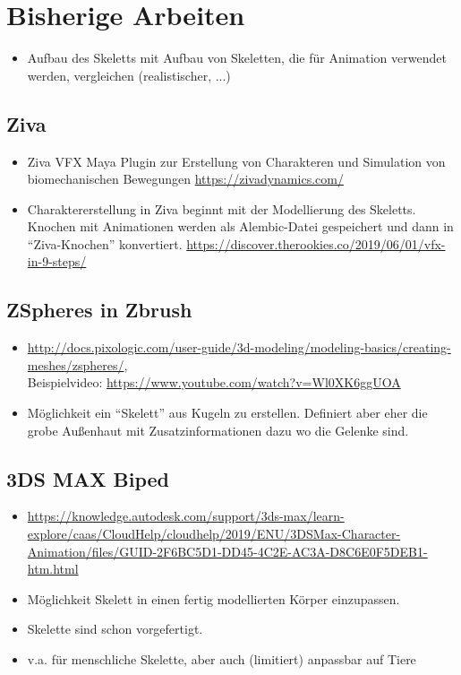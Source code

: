 \chapter{Bisherige Arbeiten}

\begin{itemize}
 \item Aufbau des Skeletts mit Aufbau von Skeletten, die für Animation verwendet werden, vergleichen (realistischer, ...)
\end{itemize}



\section{Ziva}

\begin{itemize}
 \item Ziva VFX Maya Plugin zur Erstellung von Charakteren und Simulation von biomechanischen Bewegungen \url{https://zivadynamics.com/}
 \item Charaktererstellung in Ziva beginnt mit der Modellierung des Skeletts. Knochen mit Animationen werden als Alembic-Datei gespeichert und dann in "`Ziva-Knochen"' konvertiert. \url{https://discover.therookies.co/2019/06/01/vfx-in-9-steps/}
\end{itemize}

\section{ZSpheres in Zbrush}

\begin{itemize}
 \item \url{http://docs.pixologic.com/user-guide/3d-modeling/modeling-basics/creating-meshes/zspheres/},\\ Beispielvideo: \url{https://www.youtube.com/watch?v=Wl0XK6ggUOA}
 \item Möglichkeit ein "`Skelett"' aus Kugeln zu erstellen. Definiert aber eher die grobe Außenhaut mit Zusatzinformationen dazu wo die Gelenke sind.
\end{itemize}

\section{3DS MAX Biped}

\begin{itemize}
 \item \url{https://knowledge.autodesk.com/support/3ds-max/learn-explore/caas/CloudHelp/cloudhelp/2019/ENU/3DSMax-Character-Animation/files/GUID-2F6BC5D1-DD45-4C2E-AC3A-D8C6E0F5DEB1-htm.html}
 \item Möglichkeit Skelett in einen fertig modellierten Körper einzupassen. 
 \item Skelette sind schon vorgefertigt.
 \item v.a. für menschliche Skelette, aber auch (limitiert) anpassbar auf Tiere
\end{itemize}


